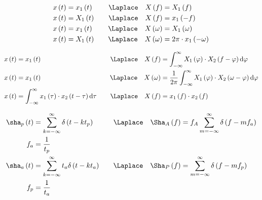 \begin{boxleft}
\end{boxleft}\begin{boxrightshaded}
\begin{align*}
x\left(t\right)&=x_1\left(t\right)\quad&\Laplace\quad X\left(f\right)&=X_1\left(f\right)\\
x\left(t\right)&=X_1\left(t\right)\quad&\Laplace\quad X\left(f\right)&=x_1\left(-f\right)\\
x\left(t\right)&=x_1\left(t\right)\quad&\Laplace\quad X\left(\omega\right)&=X_1\left(\omega\right)\\
x\left(t\right)&=X_1\left(t\right)\quad&\Laplace\quad X\left(\omega\right)&=2\pi\cdot x_1\left(-\omega\right)
\end{align*}
\end{boxrightshaded}

\begin{boxleft}
\end{boxleft}\begin{boxrightshaded}
\begin{align*}
x\left(t\right)&=x_1\left(t\right)\quad&\Laplace\quad X\left(f\right)&=\int_{-\infty}^\infty X_1\left(\varphi\right)\cdot X_2\left(f-\varphi\right)\diff \varphi\\
x\left(t\right)&=x_1\left(t\right)\quad&\Laplace\quad X\left(\omega\right)&=\frac{1}{2\pi}\int_{-\infty}^\infty X_1\left(\varphi\right)\cdot X_2\left(\omega-\varphi\right)\diff \varphi\\
x\left(t\right)&=\int_{-\infty}^\infty x_1\left(\tau\right)\cdot x_2\left(t-\tau\right)\diff \tau \quad&\Laplace\quad X\left(f\right)&=x_1\left(f\right)\cdot x_2\left(f\right) 
\end{align*}
\end{boxrightshaded}

\begin{boxleft}
\end{boxleft}\begin{boxrightshaded}
\begin{align*}
\sha_p\left(t\right)&=\sum_{k=-\infty}^{\infty}\delta\left(t-kt_p\right)\quad&\Laplace\quad\Sha_A\left(f\right)&=f_A\sum_{m=-\infty}^{\infty}\delta\left(f-mf_a\right)\\
f_a&=\frac{1}{t_p}\\
\sha_a\left(t\right)&=\sum_{k=-\infty}^{\infty}t_a\delta\left(t-kt_a\right)\quad&\Laplace\quad\Sha_P\left(f\right)&=\sum_{m=-\infty}^{\infty}\delta\left(f-mf_p\right)\\
f_p&=\frac{1}{t_a}
\end{align*}
\end{boxrightshaded}

